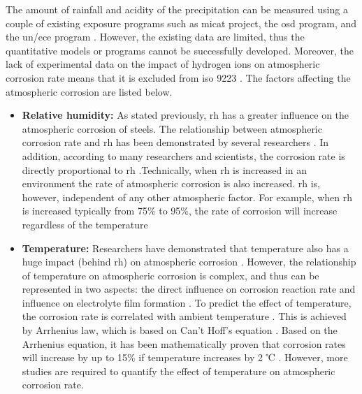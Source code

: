 The amount of rainfall and acidity of the precipitation can be measured using a couple of existing exposure programs such as \Acrfull{micat} project, the \Acrfull{osd} program, and the \Acrfull{un/ece} program \cite{cai2018influence}. However, the existing data are limited, thus the quantitative models or programs cannot be successfully developed. Moreover, the lack of experimental data on the impact of hydrogen ions on atmospheric corrosion rate means that it is excluded from \acrshort{iso} 9223 \cite{protopopoff2011surface}. The factors affecting the atmospheric corrosion are listed below.

\begin{itemize}
    \item \textbf{Relative humidity:} As stated previously, \acrshort{rh} has a greater influence on the atmospheric corrosion of steels. The relationship between atmospheric corrosion rate and \acrshort{rh} has been demonstrated by several researchers \cite{dong2005deformation, islam2018effects}. In addition, according to many researchers and scientists, the corrosion rate is directly proportional to \acrshort{rh} \cite{dong2005deformation, islam2018effects}.Technically, when \acrshort{rh} is increased in an environment the rate of atmospheric corrosion is also increased. \acrshort{rh} is, however, independent of any other atmospheric factor. For example, when \acrshort{rh} is increased typically from 75\% to 95\%, the rate of corrosion will increase regardless of the temperature \cite{sourmail2005stainless}
    
    \item \textbf{Temperature:}  Researchers have demonstrated that temperature also has a huge impact (behind \acrshort{rh}) on atmospheric corrosion \cite{islam2018effects, cengel1998heat}. However, the relationship of temperature on atmospheric corrosion is complex, and thus can be represented in two aspects: the direct influence on corrosion reaction rate and influence on electrolyte film formation \cite{cai2018influence}. To predict the effect of temperature, the corrosion rate is correlated with ambient temperature \cite{pei2021understanding}.  This is achieved by Arrhenius law, which is based on Can't Hoff's equation \cite{cai2018influence}. Based on the Arrhenius equation, it has been mathematically proven that corrosion rates will increase by up to 15\% if temperature increases by 2 ℃ \cite{mcarthur2004engineering}. However, more studies are required to quantify the effect of temperature on atmospheric corrosion rate.  
    

\end{itemize}
